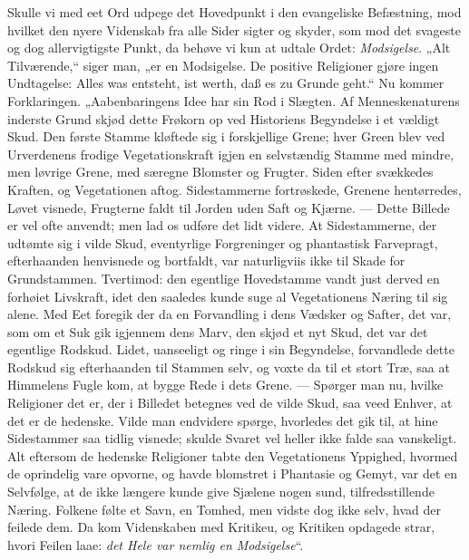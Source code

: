 \documentclass[12pt,a4paper]{book}
\begin{document}
Skulle vi med eet Ord udpege det Hovedpunkt i den evangeliske Befæstning, mod
hvilket den nyere Videnskab fra alle Sider sigter og skyder, som mod det svageste
og dog allervigtigste Punkt, da behøve vi kun at udtale Ordet:
\emph{Modsigelse}. „Alt Tilværende,“ siger man, „er en Modsigelse. De positive
Religioner gjøre ingen Undtagelse:
Alles was entsteht, ist werth, daß es zu Grunde geht.“ Nu kommer Forklaringen.
„Aabenbaringens Idee har sin Rod i Slægten. Af Menneskenaturens inderste Grund
skjød dette Frøkorn op ved Historiens Begyndelse i et vældigt Skud. Den første
Stamme kløftede sig i forskjellige Grene; hver Green blev ved Urverdenens frodige
Vegetationskraft igjen en selvstændig Stamme med mindre, men løvrige Grene, med
særegne Blomster og Frugter. Siden efter svækkedes Kraften, og Vegetationen
aftog. Sidestammerne fortrøskede, Grenene hentørredes, Løvet visnede, Frugterne
faldt til Jorden uden Saft og Kjærne. --- Dette Billede er vel ofte anvendt; men
lad os udføre det lidt videre. At Sidestammerne, der udtømte sig i vilde Skud,
eventyrlige Forgreninger og phantastisk Farvepragt, efterhaanden henvisnede og
bortfaldt, var naturligviis ikke til Skade for Grundstammen. Tvertimod: den
egentlige Hovedstamme vandt just derved en forhøiet Livskraft, idet den saaledes
kunde suge al Vegetationens Næring til sig alene. Med Eet foregik der da en
Forvandling i dens Vædsker og Safter, det var, som om et Suk gik igjennem dens
Marv, den skjød et nyt Skud, det var det egentlige Rodskud. Lidet, uanseeligt og
ringe i sin Begyndelse, forvandlede dette Rodskud sig efterhaanden til Stammen
selv, og
voxte da til et stort Træ, saa at
Himmelens Fugle kom, at bygge Rede i dets Grene. --- Spørger man nu, hvilke
Religioner det er, der i Billedet betegnes ved de vilde Skud, saa veed Enhver, at
det er de hedenske. Vilde man endvidere spørge, hvorledes det gik til, at hine
Sidestammer saa tidlig visnede; skulde Svaret vel heller ikke falde saa
vanskeligt. Alt eftersom de hedenske Religioner tabte den Vegetationens Yppighed,
hvormed de oprindelig vare
opvorne, og havde blomstret i Phantasie og Gemyt, var det en Selvfølge, at de
ikke længere kunde give Sjælene nogen sund, tilfredsstillende Næring. Folkene
følte et Savn, en Tomhed, men vidste dog ikke selv, hvad der feilede dem. Da kom
Videnskaben med
Kritikeu, og Kritiken opdagede
strar, hvori Feilen laae: \emph{det Hele var nemlig en Modsigelse}“.
\end{document}
